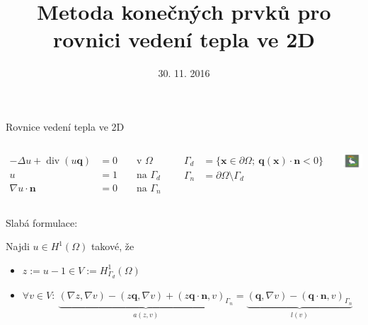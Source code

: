 \documentclass{beamer}
\renewcommand{\div}{\operatorname{div}}
\newcommand{\vc}[1]{\boldsymbol{#1}}
\begin{document}
\begin{frame}
\title{Metoda konečných prvků pro rovnici vedení tepla ve 2D}
\date{30. 11. 2016}
\maketitle
\end{frame}


\begin{frame}{Rovnice vedení tepla ve 2D}

\begin{columns}
\column{5cm}
\begin{align*}
-\Delta u + \div(u\vc q) &= 0 &&\mbox{ v }\Omega\\
u &= 1 &&\mbox{ na }\Gamma_d\\
\nabla u \cdot\vc n &= 0 &&\mbox{ na }\Gamma_n
\end{align*}

\begin{align*}
\Gamma_d &= \{ \vc x\in\partial\Omega;~\vc q(\vc x)\cdot\vc n < 0 \}\\
\Gamma_n &= \partial\Omega\setminus\Gamma_d
\end{align*}


\column{7cm}
\includegraphics[width=7cm]{velocity}
\end{columns}

Slabá formulace:

Najdi $u\in H^1(\Omega)$ takové, že
\begin{itemize}
\item $z:=u-1\in V:=H^1_{\Gamma_d}(\Omega)$
\item $\forall v\in V:~\underbrace{(\nabla z,\nabla v) - (z\vc q,\nabla v)+(z\vc q\cdot\vc n,v)_{\Gamma_n}}_{a(z,v)} = \underbrace{(\vc q,\nabla v)-(\vc q\cdot\vc n,v)_{\Gamma_n}}_{l(v)}$
\end{itemize}

\end{frame}
\end{document}
